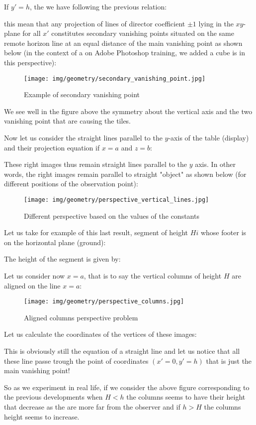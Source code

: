 	If $y'=h$, the we have following the previous relation:
	
	this mean that any projection of lines of director coefficient $\pm 1$ lying in the $xy$-plane for all $x'$ constitutes secondary vanishing points situated on the same remote horizon line at an equal distance of the main vanishing point as shown below (in the context of a on Adobe Photoshop training, we added a cube is in this perspective):
	\begin{figure}[H]
		\centering
		\texttt{[image: img/geometry/secondary\_vanishing\_point.jpg]}
		\caption{Example of secondary vanishing point}
	\end{figure}
	We see well in the figure above the symmetry about the vertical axis and the two vanishing point that are causing the tiles.

	Now let us consider the straight lines parallel to the $y$-axis of the table (display) and their projection equation if $x=a$ and $z=b$:
	
	These right images thus remain straight lines parallel to the $y$ axis. In other words, the right images remain parallel to straight "object" as shown below (for different positions of the observation point):
	\begin{figure}[H]
		\centering
		\texttt{[image: img/geometry/perspective\_vertical\_lines.jpg]}
		\caption{Different perspective based on the values of the constants}
	\end{figure}
	Let us take for example of this last result, segment of height $Hi$ whose footer is on the horizontal plane (ground):
	
	The height of the segment is given by:
	
	Let us consider now $x=a$, that is to say the vertical columns of height $H$ are aligned on the line $x=a$:
	\begin{figure}[H]
		\centering
		\texttt{[image: img/geometry/perspective\_columns.jpg]}
		\caption{Aligned columns perspective problem}
	\end{figure}
	Let us calculate the coordinates of the vertices of these images:
	
	This is obviously still the equation of a straight line and let us notice that all these line passe trough the point of coordinates $(x'=0,y'=h)$ that is just the main vanishing point!
	
	So as we experiment in real life, if we consider the above figure corresponding to the previous developments when $H<h$ the columns seems to have their height that decrease as the are more far from the observer and if $h>H$ the columns height seems to increase.
	
